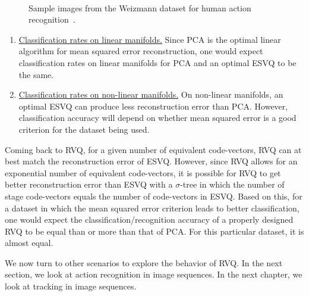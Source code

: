 									\begin{figure}[t]
									\centering	
									\\
									\caption{Sample images from the Weizmann dataset for human action recognition~\cite{2007_JNL_SpaceTimeShapes_Gorelick}.}							
									\label{fig:Weizmann_sequence}				
									\end{figure}



\begin{enumerate}
\item \underline{Classification rates on linear manifolds.}  Since PCA is the optimal linear algorithm for mean squared error reconstruction, one would expect classification rates on linear manifolds for PCA and an optimal ESVQ to be the same.  
\item \underline{Classification rates on non-linear manifolds.}  On non-linear manifolds, an optimal ESVQ can produce less reconstruction error than PCA.  However, classification accuracy will depend on whether mean squared error is a good criterion for the dataset being used.
\end{enumerate}

Coming back to RVQ, for a given number of equivalent code-vectors, RVQ can at best match the reconstruction error of ESVQ.  However, since RVQ allows for an exponential number of equivalent code-vectors, it is possible for RVQ to get better reconstruction error than ESVQ with a $\sigma$-tree in which the number of stage code-vectors equals the number of code-vectors in ESVQ.  Based on this, for a dataset in which the mean squared error criterion leads to better classification, one would expect the classification/recognition accuracy of a properly designed RVQ to be equal than or more than that of PCA.  For this particular dataset, it is almost equal.  

We now turn to other scenarios to explore the behavior of RVQ.  In the next section, we look at action recognition in image sequences.  In the next chapter, we look at tracking in image sequences.


